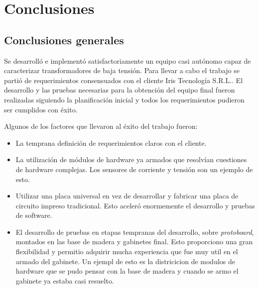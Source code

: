 
\chapter{Conclusiones} %

\label{Chapter5} %




\section{Conclusiones generales }

Se desarrolló e implementó satisfactoriamente un equipo casi autónomo capaz de caracterizar transformadores de baja tensión. Para llevar a cabo el trabajo se partió de requerimientos consensuados con el cliente Iris Tecnología S.R.L.. El desarrollo y las pruebas necesarias para la obtención del equipo final fueron realizadas siguiendo la planificación inicial y todos los requerimientos pudieron ser cumplidos con éxito.

Algunos de los factores que llevaron al éxito del trabajo fueron:
\begin{itemize}
\item La temprana definición de requerimientos claros con el cliente.
\item La utilización de módulos de hardware ya armados que resolvían cuestiones de hardware complejas. Los sensores de corriente y tensión son un ejemplo de esto.
\item Utilizar una placa universal en vez de desarrollar y fabricar una placa de circuito impreso tradicional. Esto aceleró enormemente el desarrollo y pruebas de software.
\item El desarrollo de pruebas en etapas tempranas del desarrollo, sobre \textit{protoboard}, montados en las base de madera y gabinetes final. Esto proporciono una gran flexibilidad y permitio adquirir mucha experiencia que fue muy util en el armado del gabinete. Un ejempl de esto es la districicion de modulos de hardware que se pudo pensar con la base de madera y cuando se armo el gabinete ya estaba casi resuelto.
\end{itemize}






